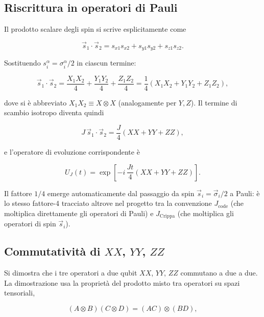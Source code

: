 \documentclass[11pt,a4paper]{article}
\begin{document}
\subsection{Riscrittura in operatori di Pauli}

Il prodotto scalare degli spin si scrive esplicitamente come

\begin{equation}
\vec s_1\cdot\vec s_2 = s_{x1}s_{x2} + s_{y1}s_{y2} + s_{z1}s_{z2}.
\end{equation}

Sostituendo $s_i^\alpha = \sigma_i^\alpha/2$ in ciascun termine:

\begin{equation}
\vec s_1\cdot\vec s_2 = \frac{X_1X_2}{4} + \frac{Y_1Y_2}{4} + \frac{Z_1Z_2}{4} = \frac{1}{4}\left(X_1X_2 + Y_1Y_2 + Z_1Z_2\right),
\end{equation}

dove si è abbreviato $X_1X_2 \equiv X\otimes X$ (analogamente per $Y,Z$). Il termine di scambio isotropo diventa quindi

\begin{equation}
J\,\vec s_1\cdot\vec s_2 = \frac{J}{4}\left(XX+YY+ZZ\right),
\end{equation}

e l'operatore di evoluzione corrispondente è

\begin{equation}
U_J(t) = \exp\!\left[-i\,\frac{Jt}{4}\left(XX+YY+ZZ\right)\right].
\end{equation}

Il fattore $1/4$ emerge automaticamente dal passaggio da spin $\vec s_i=\vec\sigma_i/2$ a Pauli: è lo stesso fattore-4 tracciato altrove nel progetto tra la convenzione $J_{\mathrm{code}}$ (che moltiplica direttamente gli operatori di Pauli) e $J_{\mathrm{Crippa}}$ (che moltiplica gli operatori di spin $\vec s_i$).

\subsection{Commutatività di $XX$, $YY$, $ZZ$}
\label{subsec:commXYZ}

Si dimostra che i tre operatori a due qubit $XX$, $YY$, $ZZ$ commutano a due a due. La dimostrazione usa la proprietà del prodotto misto tra operatori su spazi tensoriali,

\begin{equation}
(A\otimes B)(C\otimes D) = (AC)\otimes(BD),
\end{equation}
\end{document}
